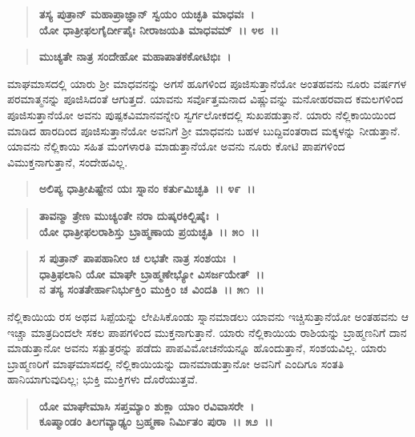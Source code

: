 \begin{verse}
\textbf{ತಸ್ಯ ಪುತ್ರಾನ್ ಮಹಾಪ್ರಾಜ್ಞಾನ್ ಸ್ವಯಂ ಯಚ್ಛತಿ ಮಾಧವಃ~।}\\\textbf{ಯೋ ಧಾತ್ರೀಫಲಗೈರ್ದೀಪೈಃ ನೀರಾಜಯತಿ ಮಾಧವಮ್~।। ೪೮~।। }
\end{verse}

\begin{verse}
\textbf{ಮುಚ್ಯತೇ ನಾತ್ರ ಸಂದೇಹೋ ಮಹಾಪಾತಕಕೋಟಿಭಿಃ~।}
\end{verse}

ಮಾಘಮಾಸದಲ್ಲಿ ಯಾರು ಶ‍್ರೀ ಮಾಧವನನ್ನು ಅಗಸೆ ಹೂಗಳಿಂದ ಪೂಜಿಸುತ್ತಾನೆಯೋ ಅಂತಹವನು ನೂರು ವರ್ಷಗಳ ಪರಮಾತ್ಮನನ್ನು ಪೂಜಿಸಿದಂತೆ ಆಗುತ್ತದೆ. ಯಾವನು ಸರ್ವೊತ್ತಮನಾದ ವಿಷ್ಣುವನ್ನು ಮನೋಹರವಾದ ಕಮಲಗಳಿಂದ ಪೂಜಿಸುತ್ತಾನೆಯೋ ಅವನು ಪುಷ್ಪಕವಿಮಾನವನ್ನೇರಿ ಸ್ವರ್ಗಲೋಕದಲ್ಲಿ ಸುಖಪಡುತ್ತಾನೆ. ಯಾರು ನೆಲ್ಲಿಕಾಯಿಯಿಂದ ಮಾಡಿದ ಹಾರದಿಂದ ಪೂಜಿಸುತ್ತಾನೆಯೋ ಅವನಿಗೆ ಶ‍್ರೀ ಮಾಧವನು ಬಹಳ ಬುದ್ದಿವಂತರಾದ ಮಕ್ಕಳನ್ನು ನೀಡುತ್ತಾನೆ. ಯಾವನು ನೆಲ್ಲಿಕಾಯಿ ಸಹಿತ ಮಂಗಳಾರತಿ ಮಾಡುತ್ತಾನೆಯೋ ಅವನು ನೂರು ಕೋಟಿ ಪಾಪಗಳಿಂದ ವಿಮುಕ್ತನಾಗುತ್ತಾನೆ, ಸಂದೇಹವಿಲ್ಲ.

\begin{verse}
\textbf{ಅಲಿಪ್ಯ ಧಾತ್ರೀಪಿಷ್ಟೇನ ಯಃ ಸ್ನಾನಂ ಕರ್ತುಮಿಚ್ಛತಿ~।। ೪೯~।।} 
\end{verse}

\begin{verse}
\textbf{ತಾವನ್ಮಾ ತ್ರೇಣ ಮುಚ್ಯಂತೇ ನರಾ ದುಷ್ಕರಕಿಲ್ಬಿಷೈಃ~।}\\\textbf{ಯೋ ಧಾತ್ರೀಫಲರಾಶಿಸ್ತು ಬ್ರಾಹ್ಮಣಾಯ ಪ್ರಯಚ್ಛತಿ~।। ೫೦~।।}
\end{verse}

\begin{verse}
\textbf{ಸ ಪುತ್ರಾನ್ ಪಾಪಹಾನೀಂ ಚ ಲಭತೇ ನಾತ್ರ ಸಂಶಯಃ~।}\\\textbf{ಧಾತ್ರಿಫಲಾನಿ ಯೋ ಮಾಘೇ ಬ್ರಾಹ್ಮಣೇಭ್ಯೋ ವಿಸರ್ಜಯೇತ್~।।}\\\textbf{ನ ತಸ್ಯ ಸಂತತೇರ್ಹಾನಿರ್ಭುಕ್ತಿಂ ಮುಕ್ತಿಂ ಚ ವಿಂದತಿ~।। ೫೧~।।}
\end{verse}

ನೆಲ್ಲಿಕಾಯಿಯ ರಸ ಅಥವ ಸಿಪ್ಪೆಯನ್ನು ಲೇಪಿಸಿಕೊಂಡು ಸ್ನಾನಮಾಡಲು ಯಾವನು ಇಚ್ಚಿಸುತ್ತಾನೆಯೋ ಅಂತಹವನು ಆ ಇಚ್ಚಾ ಮಾತ್ರದಿಂದಲೇ ಸಕಲ ಪಾಪಗಳಿಂದ ಮುಕ್ತನಾಗುತ್ತಾನೆ. ಯಾರು ನೆಲ್ಲಿಕಾಯಿಯ ರಾಶಿಯನ್ನು ಬ್ರಾಹ್ಮಣನಿಗೆ ದಾನ ಮಾಡುತ್ತಾನೋ ಅವನು ಸತ್ಪುತ್ರರನ್ನು ಪಡೆದು ಪಾಪವಿಮೋಚನೆಯನ್ನೂ ಹೊಂದುತ್ತಾನೆ, ಸಂಶಯವಿಲ್ಲ. ಯಾರು ಬ್ರಾಹ್ಮಣರಿಗೆ ಮಾಘಮಾಸದಲ್ಲಿ ನೆಲ್ಲಿಕಾಯಿಯನ್ನು ದಾನಮಾಡುತ್ತಾನೋ ಅವನಿಗೆ ಎಂದಿಗೂ ಸಂತತಿ ಹಾನಿಯಾಗುವುದಿಲ್ಲ; ಭುಕ್ತಿ ಮುಕ್ತಿಗಳು ದೊರೆಯುತ್ತವೆ.

\begin{verse}
\textbf{ಯೋ ಮಾಘೇಮಾಸಿ ಸಪ್ತಮ್ಯಾಂ ಶುಕ್ಲಾ ಯಾಂ ರವಿವಾಸರೇ~।}\\\textbf{ಕೂಷ್ಮಾಂಡಂ ತಿಲಗವ್ಯಾಢ್ಯಂ ಬ್ರಹ್ಮಣಾ ನಿರ್ಮಿತಂ ಪುರಾ~।। ೫೨~।। }
\end{verse}

